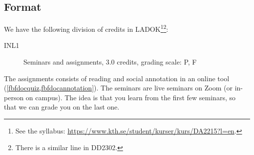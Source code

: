 \subsection{Format}

We have the following division of credits in LADOK\footnote{%
  See the syllabus:
  \url{https://www.kth.se/student/kurser/kurs/DA2215?l=en}.
}\footnote{%
  There is a similar line in DD2302.
}:
\begin{description}
  \item[INL1] Seminars and assignments, 3.0 credits, grading scale: P, F
\end{description}

The assignments consists of reading and social annotation in an online tool 
(\cref{fbfdocquiz,fbfdocannotation}).
The seminars are live seminars on Zoom (or in-person on campus).
The idea is that you learn from the first few seminars, so that we can grade 
you on the last one.

